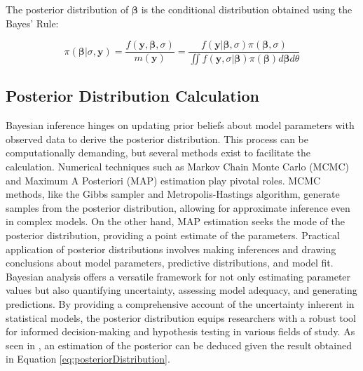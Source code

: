 The posterior distribution of $\bm{\beta}$ is the conditional distribution obtained using the Bayes' Rule:

\begin{equation}
\pi \left( \bm{\beta}|\sigma ,\bm{y} \right) =  \frac{f\left(\bm{y},\bm{\beta},\sigma\right)}{m \left( \bm{y} \right)} = \frac{f\left( \bm{y}| \bm{\beta}, \sigma\right) \pi \left( \bm{\beta},\sigma \right)}{\iint f\left( \bm{y}, \sigma | \bm{\beta} \right) \pi \left( \bm{\beta} \right) d \bm{\beta} d \theta}
\label{eq:posteriorDistribution}
\end{equation}

\subsection{Posterior Distribution Calculation}

Bayesian inference hinges on updating prior beliefs about model parameters with observed data to derive the posterior distribution. This process can be computationally demanding, but several methods exist to facilitate the calculation. Numerical techniques such as Markov Chain Monte Carlo (MCMC) and Maximum A Posteriori (MAP) estimation play pivotal roles. MCMC methods, like the Gibbs sampler and Metropolis-Hastings algorithm, generate samples from the posterior distribution, allowing for approximate inference even in complex models. On the other hand, MAP estimation seeks the mode of the posterior distribution, providing a point estimate of the parameters. Practical application of posterior distributions involves making inferences and drawing conclusions about model parameters, predictive distributions, and model fit. Bayesian analysis offers a versatile framework for not only estimating parameter values but also quantifying uncertainty, assessing model adequacy, and generating predictions. By providing a comprehensive account of the uncertainty inherent in statistical models, the posterior distribution equips researchers with a robust tool for informed decision-making and hypothesis testing in various fields of study. As seen in \cite{gelman2013bayesian}, an estimation of the posterior can be deduced given the result obtained in Equation \ref{eq:posteriorDistribution}.

